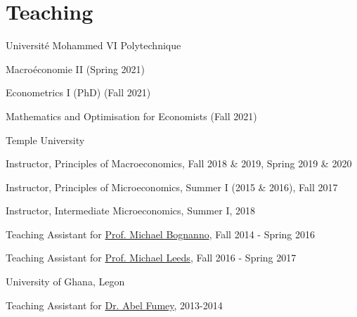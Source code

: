 \documentclass[12pt,letterpaper]{article}
\renewenvironment{itemize}{
  \begin{list}{}{
    \setlength{\leftmargin}{1.5em}
  }
}{
  \end{list}
}
\begin{document}
\section*{Teaching}
\begin{enumerate}
	\item Universit\'e Mohammed VI Polytechnique
	\begin{itemize}
		\item Macro\'economie II (Spring 2021)
		\item Econometrics I (PhD) (Fall 2021)
		\item Mathematics and Optimisation for Economists (Fall 2021)
	\end{itemize}
	\item Temple University
	\begin{itemize}
		\item Instructor, Principles of Macroeconomics, Fall 2018 \& 2019, Spring 2019 \& 2020
		\item Instructor, Principles of Microeconomics, Summer I (2015 \& 2016), Fall 2017
		\item Instructor, Intermediate Microeconomics, Summer I, 2018
		\item Teaching Assistant for \href{https://liberalarts.temple.edu/academics/faculty/bognanno-michael}{Prof. Michael Bognanno}, Fall 2014 - Spring 2016
		\item Teaching Assistant for \href{https://liberalarts.temple.edu/academics/faculty/leeds-michael}{Prof. Michael Leeds}, Fall 2016 - Spring 2017
	\end{itemize}
	\item University of Ghana, Legon
	\begin{itemize}
		\item Teaching Assistant for \href{https://www.ug.edu.gh/economics/staff/abel-fumey}{Dr. Abel Fumey}, 2013-2014
	\end{itemize}
\end{enumerate}
\end{document}
